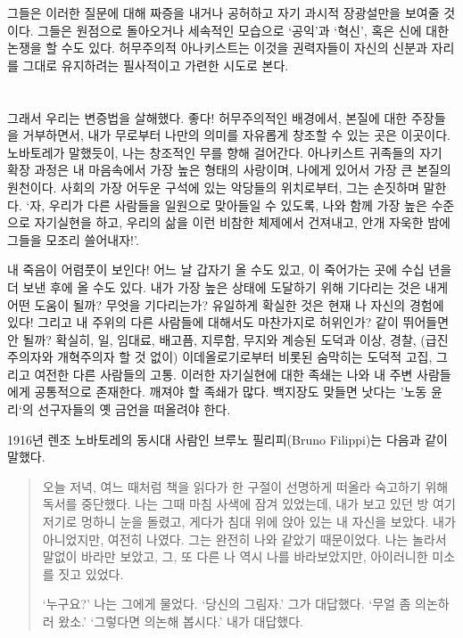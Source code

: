 \documentclass[10pt, b6paper, openany]{memoir}
\begin{document}
\begin{article}
그들은 이러한 질문에 대해 짜증을 내거나 공허하고 자기 과시적 장광설만을 보여줄 것이다. 그들은 원점으로 돌아오거나 세속적인 모습으로 `공익'과 `혁신', 혹은 신에 대한 논쟁을 할 수도 있다. 허무주의적 아나키스트는 이것을 권력자들이 자신의 신분과 자리를 그대로 유지하려는 필사적이고 가련한 시도로 본다. 

\section{}

그래서 우리는 변증법을 살해했다. 좋다! 허무주의적인 배경에서, 본질에 대한 주장들을 거부하면서, 내가 무로부터 나만의 의미를 자유롭게 창조할 수 있는 곳은 이곳이다. 노바토레가 말했듯이, 나는 창조적인 무를 향해 걸어간다. 아나키스트 귀족들의 자기 확장 과정은 내 마음속에서 가장 높은 형태의 사랑이며, 나에게 있어서 가장 큰 본질의 원천이다. 사회의 가장 어두운 구석에 있는 악당들의 위치로부터, 그는 손짓하며 말한다. `자, 우리가 다른 사람들을 일원으로 맞아들일 수 있도록, 나와 함께 가장 높은 수준으로 자기실현을 하고, 우리의 삶을 이런 비참한 체제에서 건져내고, 안개 자욱한 밤에 그들을 모조리 쓸어내자!'. 

내 죽음이 어렴풋이 보인다! 어느 날 갑자기 올 수도 있고, 이 죽어가는 곳에 수십 년을 더 보낸 후에 올 수도 있다. 내가 가장 높은 상태에 도달하기 위해 기다리는 것은 내게 어떤 도움이 될까? 무엇을 기다리는가? 유일하게 확실한 것은 현재 나 자신의 경험에 있다! 그리고 내 주위의 다른 사람들에 대해서도 마찬가지로 허위인가? 같이 뛰어들면 안 될까? 확실히, 일, 임대료, 배고픔, 지루함, 무지와 계승된 도덕과 이상, 경찰, (급진주의자와 개혁주의자 할 것 없이) 이데올로기로부터 비롯된 숨막히는 도덕적 고집, 그리고 여전한 다른 사람들의 고통. 이러한 자기실현에 대한 족쇄는 나와 내 주변 사람들에게 공통적으로 존재한다. 깨져야 할 족쇄가 많다. 백지장도 맞들면 낫다는 '노동 윤리`의 선구자들의 옛 금언을 떠올려야 한다.

1916년 렌조 노바토레의 동시대 사람인 브루노 필리피(Bruno Filippi)는 다음과 같이 말했다.

\begin{quote}
오늘 저녁, 여느 때처럼 책을 읽다가 한 구절이 선명하게 떠올라 숙고하기 위해 독서를 중단했다. 나는 그때 마침 사색에 잠겨 있었는데, 내가 보고 있던 방 여기저기로 멍하니 눈을 돌렸고, 게다가 침대 위에 앉아 있는 내 자신을 보았다. 내가 아니었지만, 여전히 나였다. 그는 완전히 나와 같았기 때문이었다. 나는 놀라서 말없이 바라만 보았고, 그, 또 다른 나 역시 나를 바라보았지만, 아이러니한 미소를 짓고 있었다. 

`누구요?' 나는 그에게 물었다. `당신의 그림자.' 그가 대답했다. `무얼 좀 의논하러 왔소.' `그렇다면 의논해 봅시다.' 내가 대답했다. 


\end{quote}
\end{article}
\end{document}
